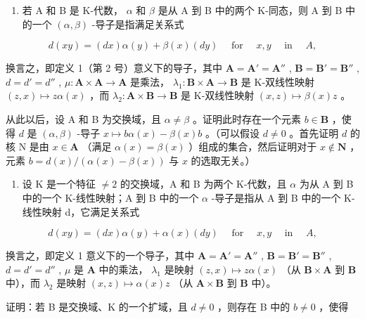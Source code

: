 \BourbakiExercisesSection

\begin{enumerate}
\def\labelenumi{\arabic{enumi}.}
\tightlist
\item
  若 A 和 B 是 K-代数， \(\alpha\) 和 \(\beta\) 是从 A 到 B 中的两个 K-同态，则 A 到 B 中的一个 \((\alpha, \beta)\) -导子是指满足关系式
\end{enumerate}

\[
d (x y) = (d x) \alpha (y) + \beta (x) (d y) \quad \text { for } \quad x, y \quad \text { in } \quad A,
\]

换言之，即定义 1（第 2 号）意义下的导子，其中 \(\mathbf{A} = \mathbf{A}' = \mathbf{A}''\) , \(\mathbf{B} = \mathbf{B}' = \mathbf{B}''\) , \(d = d' = d''\) , \(\mu: \mathbf{A} \times \mathbf{A} \to \mathbf{A}\) 是乘法， \(\lambda_1: \mathbf{B} \times \mathbf{A} \to \mathbf{B}\) 是 K-双线性映射 \((z, x) \mapsto z\alpha(x)\) ，而 \(\lambda_2: \mathbf{A} \times \mathbf{B} \to \mathbf{B}\) 是 K-双线性映射 \((x, z) \mapsto \beta(x)z\) 。

从此以后，设 A 和 B 为交换域，且 \(\alpha \neq \beta\) 。证明此时存在一个元素 \(b \in \mathbf{B}\) ，使得 \(d\) 是 \((\alpha, \beta)\) -导子 \(x \mapsto b\alpha(x) - \beta(x)b\) 。（可以假设 \(d \neq 0\) 。首先证明 \(d\) 的核 N 是由 \(x \in \mathbf{A}\) （满足 \(\alpha(x) = \beta(x)\) ）组成的集合，然后证明对于 \(x \notin \mathbf{N}\) ，元素 \(b = d(x)/( \alpha(x) - \beta(x))\) 与 \(x\) 的选取无关。）

\begin{enumerate}
\def\labelenumi{\arabic{enumi}.}
\setcounter{enumi}{1}
\tightlist
\item
  设 K 是一个特征 \(\neq2\) 的交换域，A 和 B 为两个 K-代数，且 \(\alpha\) 为从 A 到 B 中的一个 K-线性映射；A 到 B 中的一个 \(\alpha\) -导子是指从 A 到 B 中的一个 K-线性映射 d，它满足关系式
\end{enumerate}

\[
d (x y) = (d x) \alpha (y) + \alpha (x) (d y) \quad \text { for } \quad x, y \quad \text { in } \quad A,
\]

换言之，即定义 1 意义下的一个导子，其中 \(\mathbf{A} = \mathbf{A}' = \mathbf{A}''\) , \(\mathbf{B} = \mathbf{B}' = \mathbf{B}''\) , \(d = d' = d''\) , \(\mu\) 是 \(\mathbf{A}\) 中的乘法， \(\lambda_1\) 是映射 \((z,x) \mapsto z\alpha(x)\) （从 \(\mathbf{B} \times \mathbf{A}\) 到 \(\mathbf{B}\) 中），而 \(\lambda_2\) 是映射 \((x,z) \mapsto \alpha(x)z\) （从 \(\mathbf{A} \times \mathbf{B}\) 到 \(\mathbf{B}\) 中）。

证明：若 B 是交换域、K 的一个扩域，且 \(d \neq 0\) ，则存在 B 中的 \(b \neq 0\) ，使得

